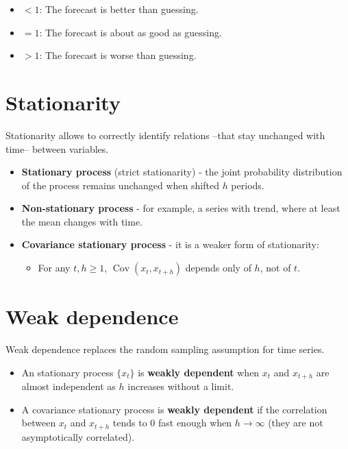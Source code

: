\documentclass[10pt, a4paper, landscape]{article}
\DeclareMathOperator{\E}{E}
\DeclareMathOperator{\Var}{Var}
\DeclareMathOperator{\Cov}{Cov}
\begin{document}
\begin{multicols}{3}
\begin{itemize}[leftmargin=*]
	\item \( < 1 \): The forecast is better than guessing.
	\item \( = 1 \): The forecast is about as good as guessing.
	\item \( > 1 \): The forecast is worse than guessing.
\end{itemize}

\columnbreak

\section*{Stationarity}

Stationarity allows to correctly identify relations --that stay unchanged with time-- between variables.

\begin{itemize}[leftmargin=*]
	\item \textbf{Stationary process} (strict stationarity) - the joint probability distribution of the process remains unchanged when shifted \( h \) periods.
	\item \textbf{Non-stationary process} - for example, a series with trend, where at least the mean changes with time.
	\item \textbf{Covariance stationary process} - it is a weaker form of stationarity:
	\begin{itemize}[leftmargin=*]
		\item For any \( t, h \geq 1 \), \( \Cov(x_{t}, x_{t + h}) \) depends only of \( h \), not of \( t \).
	\end{itemize}
\end{itemize}

\section*{Weak dependence}

Weak dependence replaces the random sampling assumption for time series.

\begin{itemize}[leftmargin=*]
	\item An stationary process \( \{ x_{t} \} \) is \textbf{weakly dependent} when \( x_{t} \) and \( x_{t + h} \) are almost independent as \( h \) increases without a limit.
	\item A covariance stationary process is \textbf{weakly dependent} if the correlation between \( x_{t} \) and \( x_{t + h} \) tends to 0 fast enough when \( h \rightarrow \infty \) (they are not asymptotically correlated).
\end{itemize}


\end{multicols}
\end{document}
